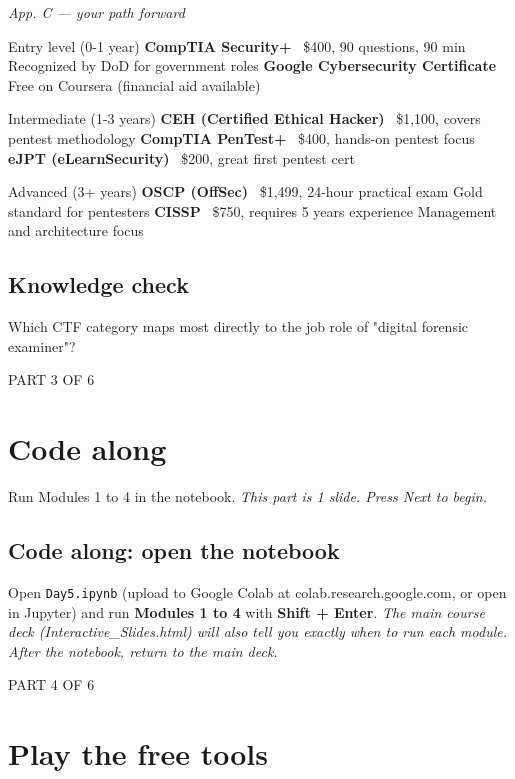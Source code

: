 \documentclass[12pt,openany]{book}
\begin{document}
{\small\itshape\color{gray}App. C --- your path forward}

Entry level (0-1 year)
\textbf{CompTIA Security+}
~\$400, 90 questions, 90 min
Recognized by DoD for government roles
\textbf{Google Cybersecurity Certificate}
Free on Coursera (financial aid available)

Intermediate (1-3 years)
\textbf{CEH (Certified Ethical Hacker)}
~\$1,100, covers pentest methodology
\textbf{CompTIA PenTest+}
~\$400, hands-on pentest focus
\textbf{eJPT (eLearnSecurity)}
~\$200, great first pentest cert

Advanced (3+ years)
\textbf{OSCP (OffSec)}
~\$1,499, 24-hour practical exam
Gold standard for pentesters
\textbf{CISSP}
~\$750, requires 5 years experience
Management and architecture focus

\medskip

\subsection*{Knowledge check}

Which CTF category maps most directly to the job role of "digital forensic examiner"?

\vspace{4pt}\noindent\textsc{PART 3 OF 6}


\section*{Code along}

Run Modules 1 to 4 in the notebook.
{\small\itshape\color{gray}This part is 1 slide. Press Next to begin.}

\medskip

\subsection*{Code along: open the notebook}

Open \texttt{Day5.ipynb} (upload to Google Colab at colab.research.google.com, or open in Jupyter) and run \textbf{Modules 1 to 4} with \textbf{Shift + Enter}.
{\small\itshape\color{gray}The main course deck (Interactive\_Slides.html) will also tell you exactly when to run each module. After the notebook, return to the main deck.}

\medskip

\vspace{4pt}\noindent\textsc{PART 4 OF 6}


\section*{Play the free tools}
\end{document}
